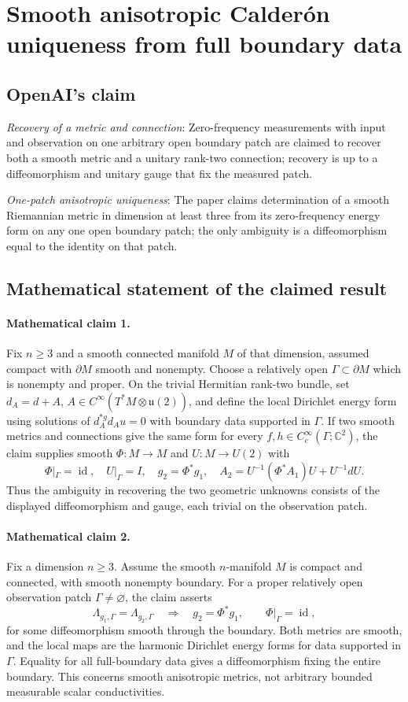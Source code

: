 \documentclass[11pt]{article}
\begin{document}
\section*{Smooth anisotropic Calderón uniqueness from full boundary data}

\subsection{OpenAI's claim}
\textit{Recovery of a metric and connection}: Zero-frequency measurements with input and observation on one arbitrary open boundary patch are claimed to recover both a smooth metric and a unitary rank-two connection; recovery is up to a diffeomorphism and unitary gauge that fix the measured patch.

\textit{One-patch anisotropic uniqueness}: The paper claims determination of a smooth Riemannian metric in dimension at least three from its zero-frequency energy form on any one open boundary patch; the only ambiguity is a diffeomorphism equal to the identity on that patch.

\subsection{Mathematical statement of the claimed result}
\paragraph{Mathematical claim 1.} Fix $n\ge3$ and a smooth connected manifold $M$ of that dimension, assumed compact with $\partial M$ smooth and nonempty. Choose a relatively open $\Gamma\subset\partial M$ which is nonempty and proper. On the trivial Hermitian rank-two bundle, set $d_A=d+A$, $A\in C^\infty(T^*M\otimes\mathfrak u(2))$, and define the local Dirichlet energy form using solutions of $d_A^{*g}d_Au=0$ with boundary data supported in $\Gamma$. If two smooth metrics and connections give the same form for every $f,h\in C_c^\infty(\Gamma;\mathbb C^2)$, the claim supplies smooth $\Phi:M\to M$ and $U:M\to U(2)$ with \[\Phi|_\Gamma=\operatorname{id},\quad U|_\Gamma=I,\quad g_2=\Phi^*g_1,\quad A_2=U^{-1}(\Phi^*A_1)U+U^{-1}dU.\] Thus the ambiguity in recovering the two geometric unknowns consists of the displayed diffeomorphism and gauge, each trivial on the observation patch.

\paragraph{Mathematical claim 2.} Fix a dimension $n\ge3$. Assume the smooth $n$-manifold $M$ is compact and connected, with smooth nonempty boundary. For a proper relatively open observation patch $\Gamma\ne\varnothing$, the claim asserts \[\Lambda_{g_1,\Gamma}=\Lambda_{g_2,\Gamma}\quad\Longrightarrow\quad g_2=\Phi^*g_1,\qquad\Phi|_\Gamma=\operatorname{id},\] for some diffeomorphism smooth through the boundary. Both metrics are smooth, and the local maps are the harmonic Dirichlet energy forms for data supported in $\Gamma$. Equality for all full-boundary data gives a diffeomorphism fixing the entire boundary. This concerns smooth anisotropic metrics, not arbitrary bounded measurable scalar conductivities.
\end{document}
